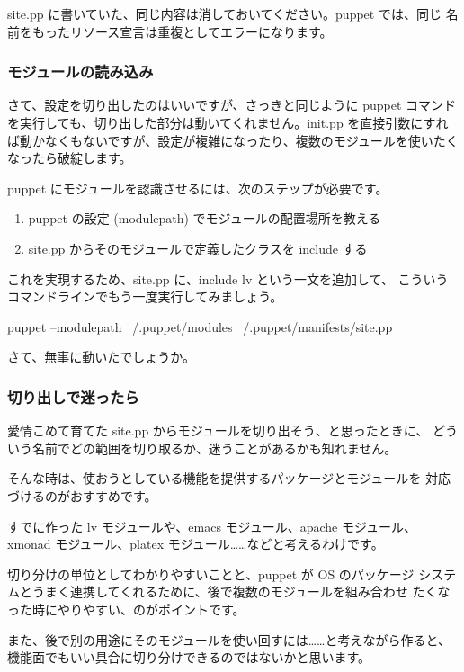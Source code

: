 \documentclass[mingoth,a4paper]{jsarticle}
\begin{document}
site.pp に書いていた、同じ内容は消しておいてください。puppet では、同じ
名前をもったリソース宣言は重複としてエラーになります。

\subsubsection{モジュールの読み込み}

さて、設定を切り出したのはいいですが、さっきと同じように puppet コマンド
を実行しても、切り出した部分は動いてくれません。init.pp を直接引数にすれ
ば動かなくもないですが、設定が複雑になったり、複数のモジュールを使いたく
なったら破綻します。

puppet にモジュールを認識させるには、次のステップが必要です。

\begin{enumerate}
 \item puppet の設定 (modulepath) でモジュールの配置場所を教える
 \item site.pp からそのモジュールで定義したクラスを include する
\end{enumerate}

これを実現するため、site.pp に、include lv という一文を追加して、
こういうコマンドラインでもう一度実行してみましょう。

\begin{commandline}
puppet --modulepath ~/.puppet/modules ~/.puppet/manifests/site.pp
\end{commandline}

さて、無事に動いたでしょうか。

\subsubsection{切り出しで迷ったら}

愛情こめて育てた site.pp からモジュールを切り出そう、と思ったときに、
どういう名前でどの範囲を切り取るか、迷うことがあるかも知れません。

そんな時は、使おうとしている機能を提供するパッケージとモジュールを
対応づけるのがおすすめです。

すでに作った lv モジュールや、emacs モジュール、apache モジュール、
xmonad モジュール、platex モジュール……などと考えるわけです。

切り分けの単位としてわかりやすいことと、puppet が OS のパッケージ
システムとうまく連携してくれるために、後で複数のモジュールを組み合わせ
たくなった時にやりやすい、のがポイントです。

また、後で別の用途にそのモジュールを使い回すには……と考えながら作ると、
機能面でもいい具合に切り分けできるのではないかと思います。
\end{document}
